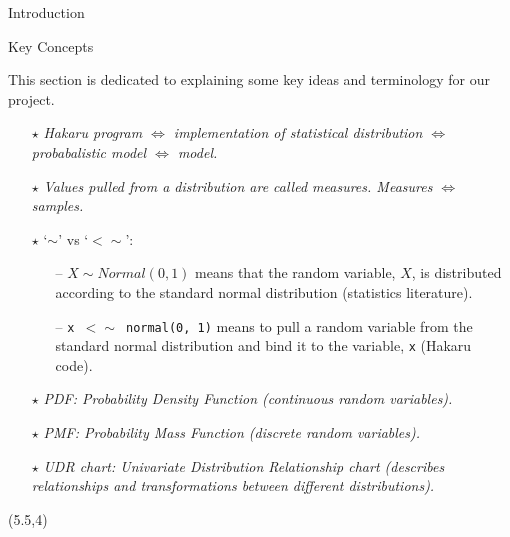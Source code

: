 \documentclass[22pt]{beamer}
\begin{document}
\begin{frame}[fragile]
\begin{textblock}{5}
\begin{block}{\Large{Introduction}}
\end{block}


\begin{block}{Key Concepts}
\justifying


\tiny{This section is dedicated to explaining some key ideas and terminology for our project.}


\begin{itemize}
	\item[\textbf{$\star$}] \textit{Hakaru program $\Longleftrightarrow$ implementation of statistical distribution $\Longleftrightarrow$ probabalistic model $\Longleftrightarrow$ model.}
	\item[\textbf{$\star$}] \textit{Values pulled from a distribution are called measures. Measures $\Longleftrightarrow$ samples.}
	\item[\textbf{$\star$}] `{\textbf{$\sim$}}' vs `{\textbf{$<\sim$}}':
      \begin{itemize}
          \tiny
          \item[--] \tiny{$X \sim Normal(0, 1)$ means that the random variable, $X$, is distributed according to the standard normal distribution (statistics literature).}
          \item[--] \tiny{{\tt \tiny{x $<\sim$ normal(0, 1)}} means to pull a random variable from the standard normal distribution and bind it to the variable, {\tt \tiny{x}} (Hakaru code).}
      \end{itemize}
	\item[\textbf{$\star$}] \textit{PDF: Probability Density Function (continuous random variables).}
	\item[\textbf{$\star$}] \textit{PMF: Probability Mass Function (discrete random variables).}
	\item[\textbf{$\star$}] \textit{UDR chart: Univariate Distribution Relationship chart (describes relationships and transformations between different distributions).}
\end{itemize}

\end{block}



\begin{textblock}{5}(5.5,4)



\end{textblock}
\end{textblock}
\end{frame}
\end{document}
